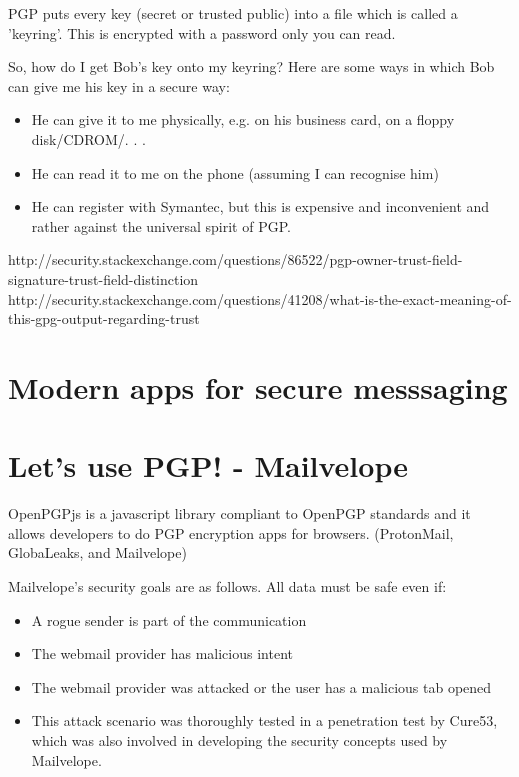 \documentclass{llncs}
\begin{document}
PGP puts every key (secret or trusted public) into a file which is called a 'keyring'. This is encrypted with a password only you can read.

So, how do I get Bob's key onto my keyring? Here are some ways in which Bob can give me his key in a secure way:

\begin{itemize}
\item    He can give it to me physically, e.g. on his business card, on a floppy disk/CDROM/. . .
\item He can read it to me on the phone (assuming I can recognise him)
\item He can register with Symantec, but this is expensive and inconvenient and rather against the universal spirit of PGP.
\end{itemize}

http://security.stackexchange.com/questions/86522/pgp-owner-trust-field-signature-trust-field-distinction
http://security.stackexchange.com/questions/41208/what-is-the-exact-meaning-of-this-gpg-output-regarding-trust

\section{Modern apps for secure messsaging}
\section{Let's use PGP! - Mailvelope}

OpenPGPjs is a javascript library compliant to OpenPGP standards and it allows developers to do PGP encryption apps for browsers. (ProtonMail, GlobaLeaks, and Mailvelope)

Mailvelope's security goals are as follows. All data must be safe even if:
\begin{itemize}
	\item A rogue sender is part of the communication
	\item The webmail provider has malicious intent
	\item The webmail provider was attacked or the user has a malicious tab opened
	\item This attack scenario was thoroughly tested in a penetration test by Cure53, which was also involved in developing the security concepts used by Mailvelope.
\end{itemize}


%

\clearpage


\end{document}
